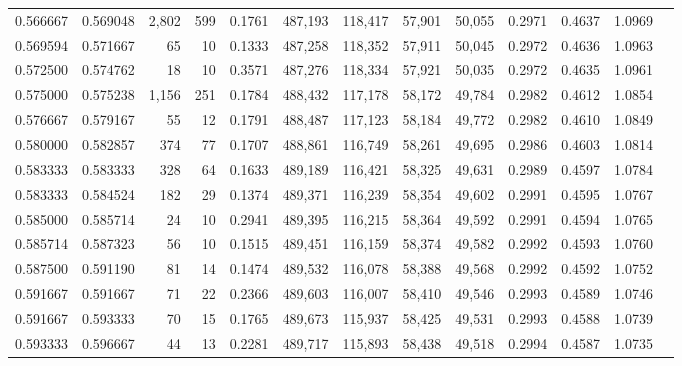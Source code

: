 \begin{tabular}{rrrrrrrrrrrrr}
0.566667 & 0.569048 &  2,802 &    599 &                                     0.1761 & 487,193 & 118,417 &  57,901 &  50,055 & 0.2971 & 0.4637 & 1.0969 \\
0.569594 & 0.571667 &     65 &     10 &                                     0.1333 & 487,258 & 118,352 &  57,911 &  50,045 & 0.2972 & 0.4636 & 1.0963 \\
0.572500 & 0.574762 &     18 &     10 &                                     0.3571 & 487,276 & 118,334 &  57,921 &  50,035 & 0.2972 & 0.4635 & 1.0961 \\
0.575000 & 0.575238 &  1,156 &    251 &                                     0.1784 & 488,432 & 117,178 &  58,172 &  49,784 & 0.2982 & 0.4612 & 1.0854 \\
0.576667 & 0.579167 &     55 &     12 &                                     0.1791 & 488,487 & 117,123 &  58,184 &  49,772 & 0.2982 & 0.4610 & 1.0849 \\
0.580000 & 0.582857 &    374 &     77 &                                     0.1707 & 488,861 & 116,749 &  58,261 &  49,695 & 0.2986 & 0.4603 & 1.0814 \\
0.583333 & 0.583333 &    328 &     64 &                                     0.1633 & 489,189 & 116,421 &  58,325 &  49,631 & 0.2989 & 0.4597 & 1.0784 \\
0.583333 & 0.584524 &    182 &     29 &                                     0.1374 & 489,371 & 116,239 &  58,354 &  49,602 & 0.2991 & 0.4595 & 1.0767 \\
0.585000 & 0.585714 &     24 &     10 &                                     0.2941 & 489,395 & 116,215 &  58,364 &  49,592 & 0.2991 & 0.4594 & 1.0765 \\
0.585714 & 0.587323 &     56 &     10 &                                     0.1515 & 489,451 & 116,159 &  58,374 &  49,582 & 0.2992 & 0.4593 & 1.0760 \\
0.587500 & 0.591190 &     81 &     14 &                                     0.1474 & 489,532 & 116,078 &  58,388 &  49,568 & 0.2992 & 0.4592 & 1.0752 \\
0.591667 & 0.591667 &     71 &     22 &                                     0.2366 & 489,603 & 116,007 &  58,410 &  49,546 & 0.2993 & 0.4589 & 1.0746 \\
0.591667 & 0.593333 &     70 &     15 &                                     0.1765 & 489,673 & 115,937 &  58,425 &  49,531 & 0.2993 & 0.4588 & 1.0739 \\
0.593333 & 0.596667 &     44 &     13 &                                     0.2281 & 489,717 & 115,893 &  58,438 &  49,518 & 0.2994 & 0.4587 & 1.0735 \\

\end{tabular}

